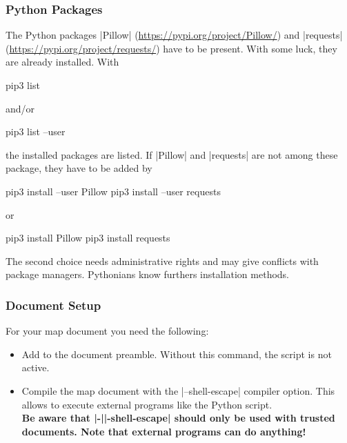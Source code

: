 \subsubsection{Python Packages}
The Python packages |Pillow| (\url{https://pypi.org/project/Pillow/})
and |requests| (\url{https://pypi.org/project/requests/}) have to be present.
With some luck, they are already installed. With
\begin{dispListing}
  pip3 list
\end{dispListing}
and/or
\begin{dispListing}
  pip3 list --user
\end{dispListing}
the installed packages are listed. If |Pillow| and |requests| are not
among these package, they have to be added by
\begin{dispListing}
  pip3 install --user Pillow
  pip3 install --user requests
\end{dispListing}
or
\begin{dispListing}
  pip3 install Pillow
  pip3 install requests
\end{dispListing}
The second choice needs administrative rights and may give conflicts
with package managers. Pythonians know furthers installation methods.

\subsubsection{Document Setup}
For your map document you need the following:
\begin{itemize}
\item Add  to the document preamble.
  Without this command, the script is not active.
\item Compile the map document with the |--shell-escape| compiler option.
  This allows to execute external programs like the Python script.\\
  \textbf{Be aware that |-||-shell-escape| should only be used
    with trusted documents. Note that external programs can do anything!}
\end{itemize}






